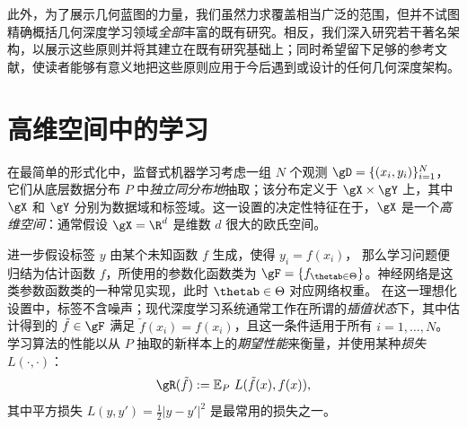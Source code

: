 此外，为了展示几何蓝图的力量，我们虽然力求覆盖相当广泛的范围，但并不试图精确概括几何深度学习领域\emph{全部}丰富的既有研究。相反，我们深入研究若干著名架构，以展示这些原则并将其建立在既有研究基础上；同时希望留下足够的参考文献，使读者能够有意义地把这些原则应用于今后遇到或设计的任何几何深度架构。

\section{高维空间中的学习}



    

在最简单的形式化中，监督式机器学习考虑一组 $N$ 个观测 $\gD=\{(x_i, y_i)\}_{i=1}^{ N}$，它们从底层数据分布 $P$ 中\emph{独立同分布地}抽取；该分布定义于 $\gX \times \gY$ 上，其中 $\gX$ 和 $\gY$ 分别为数据域和标签域。这一设置的决定性特征在于，$\gX$ 是一个{\em 高维空间}：通常假设 $\gX= \R^d$ 是维数 $d$ 很大的欧氏空间。


进一步假设标签 $y$ 由某个未知函数 $f$ 生成，使得 $y_i = f(x_i)$，
那么学习问题便归结为估计函数 $f$，所使用的参数化函数类为 $\gF=\{ f_{\thetab \in \Theta}\}$。神经网络是这类参数函数类的一种常见实现，此时 $\thetab \in \Theta$ 对应网络权重。
在这一理想化设置中，标签不含噪声；现代深度学习系统通常工作在所谓的\emph{插值状态}下，其中估计得到的 $\tilde{f} \in \gF$ 满足 $\tilde{f}(x_i) = f(x_i)$，且这一条件适用于所有 $i=1,\hdots, N$。
学习算法的性能以从 ${P}$ 抽取的新样本上的\emph{期望性能}来衡量，并使用某种{\em 损失} $L(\cdot,\cdot)$：
$$\gR(\tilde{f}):= \mathbb{E}_{P}\,\, L(\tilde{f}(x), f(x)),$$
%
其中平方损失 $L(y,y')=\frac{1}{2}|y-y'|^2$ 是最常用的损失之一。


